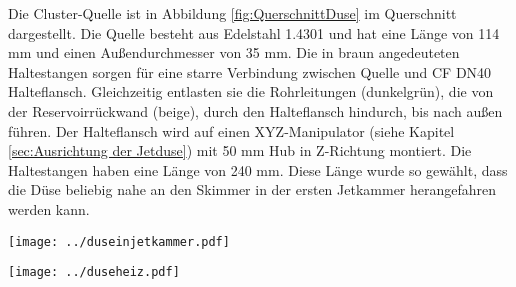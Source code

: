  Die Cluster-Quelle ist in Abbildung \ref{fig:QuerschnittDuse} im Querschnitt dargestellt. Die Quelle besteht aus Edelstahl 1.4301 und hat eine Länge von 114 mm und einen Außendurchmesser von 35 mm. Die in braun angedeuteten Haltestangen sorgen für eine starre Verbindung zwischen Quelle und CF DN40 Halteflansch. Gleichzeitig entlasten sie die Rohrleitungen (dunkelgrün), die von der Reservoirrückwand (beige), durch den Halteflansch hindurch, bis nach außen führen. Der Halteflansch wird auf einen XYZ-Manipulator (siehe Kapitel \ref{sec:Ausrichtung der Jetduse}) mit 50 mm Hub in Z-Richtung montiert. Die Haltestangen haben eine Länge von 240 mm. Diese Länge wurde so gewählt, dass die Düse beliebig nahe an den Skimmer in der ersten Jetkammer herangefahren werden kann.
 
 \begin{center}
 \begin{minipage}{\linewidth}
 \centering
 \texttt{[image: ../duseinjetkammer.pdf]}%
  \label{fig:duseinjetkammer}
 \end{minipage} 
 \end{center} 
 

 \begin{center}
  \begin{minipage}{\linewidth}
  \centering
  \texttt{[image: ../duseheiz.pdf]}%
   \label{fig:duseheiz}
  \end{minipage} 
  \end{center} 
  
